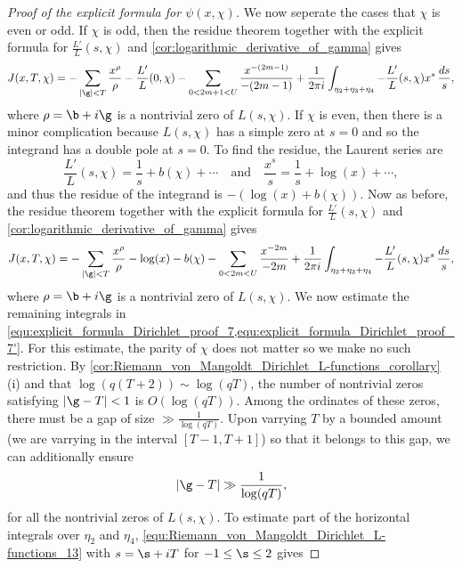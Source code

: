\begin{proof}[Proof of the explicit formula for $\psi(x,\chi)$]
        We now seperate the cases that $\chi$ is even or odd. If $\chi$ is odd, then the residue theorem together with the explicit formula for $\frac{L'}{L}(s,\chi)$ and \cref{cor:logarithmic_derivative_of_gamma} gives
        \begin{equation}\label{equ:explicit_formula_Dirichlet_proof_7}
          J(x,T,\chi) = -\sum_{|\g| < T}\frac{x^{\rho}}{\rho}-\frac{L'}{L}(0,\chi)-\sum_{0 < 2m+1 < U}\frac{x^{-(2m-1)}}{-(2m-1)}+\frac{1}{2\pi i}\int_{\eta_{2}+\eta_{3}+\eta_{4}}-\frac{L'}{L}(s,\chi)x^{s}\,\frac{ds}{s},
        \end{equation}
        where $\rho = \b+i\g$ is a nontrivial zero of $L(s,\chi)$. If $\chi$ is even, then there is a minor complication because $L(s,\chi)$ has a simple zero at $s = 0$ and so the integrand has a double pole at $s = 0$. To find the residue, the Laurent series are
        \[
          \frac{L'}{L}(s,\chi) = \frac{1}{s}+b(\chi)+\cdots \quad \text{and} \quad \frac{x^{s}}{s} = \frac{1}{s}+\log(x)+\cdots,
        \]
        and thus the residue of the integrand is $-(\log(x)+b(\chi))$. Now as before, the residue theorem together with the explicit formula for $\frac{L'}{L}(s,\chi)$ and \cref{cor:logarithmic_derivative_of_gamma} gives
        \begin{equation}\label{equ:explicit_formula_Dirichlet_proof_7'}
          J(x,T,\chi) = -\sum_{|\g| < T}\frac{x^{\rho}}{\rho}-\log(x)-b(\chi)-\sum_{0 < 2m < U}\frac{x^{-2m}}{-2m}+\frac{1}{2\pi i}\int_{\eta_{2}+\eta_{3}+\eta_{4}}-\frac{L'}{L}(s,\chi)x^{s}\,\frac{ds}{s},
        \end{equation}
        where $\rho = \b+i\g$ is a nontrivial zero of $L(s,\chi)$. We now estimate the remaining integrals in \cref{equ:explicit_formula_Dirichlet_proof_7,equ:explicit_formula_Dirichlet_proof_7'}. For this estimate, the parity of $\chi$ does not matter so we make no such restriction. By \cref{cor:Riemann_von_Mangoldt_Dirichlet_L-functions_corollary} (i) and that $\log(q(T+2)) \sim \log(qT)$, the number of nontrivial zeros satisfying $|\g-T| < 1$ is $O(\log(qT))$. Among the ordinates of these zeros, there must be a gap of size $\gg \frac{1}{\log(qT)}$. Upon varrying $T$ by a bounded amount (we are varrying in the interval $[T-1,T+1]$) so that it belongs to this gap, we can additionally ensure
        \[
          |\g-T| \gg \frac{1}{\log(qT)},
        \]
        for all the nontrivial zeros of $L(s,\chi)$. To estimate part of the horizontal integrals over $\eta_{2}$ and $\eta_{4}$, \cref{equ:Riemann_von_Mangoldt_Dirichlet_L-functions_13} with $s = \s+iT$ for $-1 \le \s \le 2$ gives

\end{proof}

